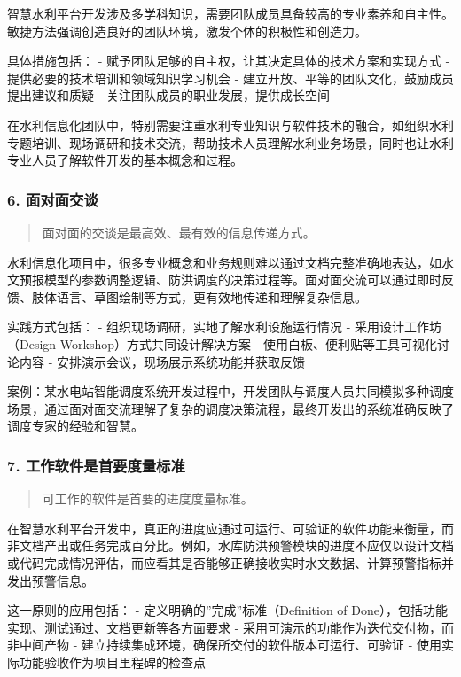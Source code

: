 智慧水利平台开发涉及多学科知识，需要团队成员具备较高的专业素养和自主性。敏捷方法强调创造良好的团队环境，激发个体的积极性和创造力。

具体措施包括： - 赋予团队足够的自主权，让其决定具体的技术方案和实现方式
- 提供必要的技术培训和领域知识学习机会 -
建立开放、平等的团队文化，鼓励成员提出建议和质疑 -
关注团队成员的职业发展，提供成长空间

在水利信息化团队中，特别需要注重水利专业知识与软件技术的融合，如组织水利专题培训、现场调研和技术交流，帮助技术人员理解水利业务场景，同时也让水利专业人员了解软件开发的基本概念和过程。

\subsubsection{6. 面对面交谈}\label{ux9762ux5bf9ux9762ux4ea4ux8c08}

\begin{quote}
面对面的交谈是最高效、最有效的信息传递方式。
\end{quote}

水利信息化项目中，很多专业概念和业务规则难以通过文档完整准确地表达，如水文预报模型的参数调整逻辑、防洪调度的决策过程等。面对面交流可以通过即时反馈、肢体语言、草图绘制等方式，更有效地传递和理解复杂信息。

实践方式包括： - 组织现场调研，实地了解水利设施运行情况 -
采用设计工作坊（Design Workshop）方式共同设计解决方案 -
使用白板、便利贴等工具可视化讨论内容 -
安排演示会议，现场展示系统功能并获取反馈

案例：某水电站智能调度系统开发过程中，开发团队与调度人员共同模拟多种调度场景，通过面对面交流理解了复杂的调度决策流程，最终开发出的系统准确反映了调度专家的经验和智慧。

\subsubsection{7.
工作软件是首要度量标准}\label{ux5de5ux4f5cux8f6fux4ef6ux662fux9996ux8981ux5ea6ux91cfux6807ux51c6}

\begin{quote}
可工作的软件是首要的进度度量标准。
\end{quote}

在智慧水利平台开发中，真正的进度应通过可运行、可验证的软件功能来衡量，而非文档产出或任务完成百分比。例如，水库防洪预警模块的进度不应仅以设计文档或代码完成情况评估，而应看其是否能够正确接收实时水文数据、计算预警指标并发出预警信息。

这一原则的应用包括： - 定义明确的''完成''标准（Definition of
Done），包括功能实现、测试通过、文档更新等各方面要求 -
采用可演示的功能作为迭代交付物，而非中间产物 -
建立持续集成环境，确保所交付的软件版本可运行、可验证 -
使用实际功能验收作为项目里程碑的检查点


